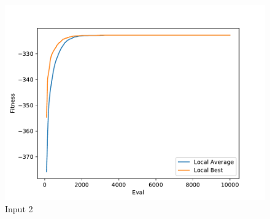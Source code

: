 \documentclass{standalone}
\begin{document}
\begin{figure}[!htb]
	\caption{Input 2}
	\label{fig:graph_2057}
	\includegraphics[width=\textwidth]{../graphs/graphs/2057.pdf}
\end{figure}
\end{document}
